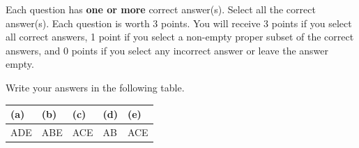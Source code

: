 

Each question has \textbf{one or more} correct answer(s).
Select all the correct answer(s). Each question is worth 3 points.
You will receive 3 points if you select all correct answers,
1 point if you select a non-empty proper subset of the correct answers,
and 0 points if you select any incorrect answer or leave the answer empty.


Write your answers in the following table.

\begin{table}[htbp]
    \centering
    \begin{tabular}{|p{1.5cm}|p{1.5cm}|p{1.5cm}|p{1.5cm}|p{1.5cm}|}
        \hline
        (a) & (b) & (c) & (d) & (e) \\
        \hline
          ADE  &  ABE   &  ACE   &   AB  &  ACE   \\
        \hline
    \end{tabular}
\end{table}

